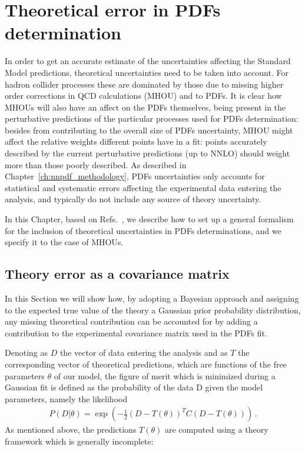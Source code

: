 \chapter{Theoretical error in PDFs determination}
\label{sec:th_error}
In order to get an accurate estimate of the uncertainties affecting the Standard Model predictions, theoretical 
uncertainties need to be taken into account. 
For hadron collider processes these are dominated by those due to missing higher order corrections in QCD calculations
(MHOU) and to PDFs. 
It is clear how MHOUs will also have an affect on the PDFs themselves, being present in the perturbative predictions
of the particular processes used for PDFs determination: besides from contributing to the overall
size of PDFs uncertainty, MHOU might affect the relative weights different points have in a fit:
points accurately described by the current perturbative predictions (up to NNLO) should weight more
than those poorly described. 
%
As described in Chapter~\ref{ch:nnpdf_methodology}, PDFs uncertainties only accounts for statistical and 
systematic errors affecting the experimental data entering the analysis, and typically do not include any source 
of theory uncertainty.

%
In this Chapter, based on Refs.~\cite{AbdulKhalek:2019bux,AbdulKhalek:2019ihb}, we describe how to set up 
a general formalism for the inclusion of theoretical uncertainties in PDFs determinations,
 and we specify it to the case of MHOUs.

 \section{Theory error as a covariance matrix}
 In this Section we will show how, by adopting a Bayesian approach and assigning to the 
 expected true value of the theory a Gaussian prior probability distribution, any missing theoretical
 contribution can be accounted for by adding a contribution to the experimental covariance matrix used in the PDFs fit.

%
Denoting as $D$ the vector of data entering the analysis and as $T$ the corresponding vector of theoretical 
predictions, which are functions of the free parameters $\theta$ of our model,
the figure of merit which is minimized during a Gaussian fit is defined as the probability of
the data D given the model parameters, namely the likelihood
\begin{align}
    P\left(D|\theta\right) = 
    \exp\left(-\frac{1}{2}\left(D-T\left(\theta\right)\right)^T C \left(D-T\left(\theta\right)\right)\right)\,.
\end{align}
As mentioned above, the predictions $T\left(\theta\right)$ are computed using a theory framework which is 
generally incomplete: